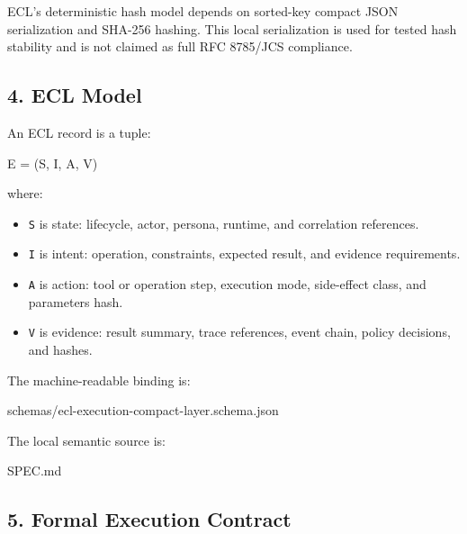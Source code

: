 \documentclass[
]{article}
\newenvironment{Shaded}{}{}
\newcommand{\NormalTok}[1]{#1}
\providecommand{\tightlist}{%
  \setlength{\itemsep}{0pt}\setlength{\parskip}{0pt}}
\begin{document}
ECL's deterministic hash model depends on sorted-key compact JSON
serialization and SHA-256 hashing. This local serialization is used for
tested hash stability and is not claimed as full RFC 8785/JCS
compliance.

\subsection{4. ECL Model}\label{ecl-model}

An ECL record is a tuple:

\begin{Shaded}
\begin{Highlighting}[]
\NormalTok{E = (S, I, A, V)}
\end{Highlighting}
\end{Shaded}

where:

\begin{itemize}
\tightlist
\item
  \texttt{S} is state: lifecycle, actor, persona, runtime, and
  correlation references.
\item
  \texttt{I} is intent: operation, constraints, expected result, and
  evidence requirements.
\item
  \texttt{A} is action: tool or operation step, execution mode,
  side-effect class, and parameters hash.
\item
  \texttt{V} is evidence: result summary, trace references, event chain,
  policy decisions, and hashes.
\end{itemize}

The machine-readable binding is:

\begin{Shaded}
\begin{Highlighting}[]
\NormalTok{schemas/ecl{-}execution{-}compact{-}layer.schema.json}
\end{Highlighting}
\end{Shaded}

The local semantic source is:

\begin{Shaded}
\begin{Highlighting}[]
\NormalTok{SPEC.md}
\end{Highlighting}
\end{Shaded}

\subsection{5. Formal Execution
Contract}\label{formal-execution-contract}
\end{document}
